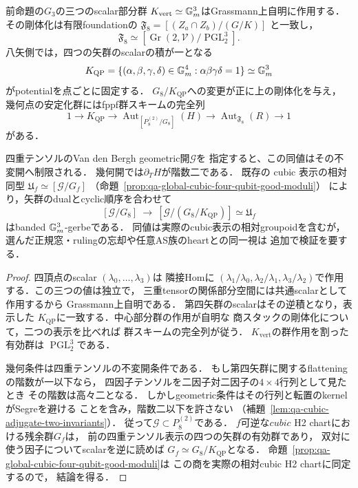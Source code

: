 \begin{corollary}
\label{cor:qa-cubic-qp-pointed-h2-gerbe}
前命題の$G_3$の三つのscalar部分群
\(K_{\mathrm{vert}}\simeq\mathbb G_m^3\)はGrassmann上自明に作用する．
その剛体化は有限foundationの
\(\mathfrak F_8=[(Z_a\cap Z_b)/(G/K)]\) と一致し，
\[
 \mathfrak F_8\simeq
 [\operatorname{Gr}(2,\mathcal V)/\operatorname{PGL}_2^3].
 \tag{Fr}\label{eq:qa-cubic-qp-rigid-foundation}
\]
八矢側では，四つの矢群のscalarの積が一となる
\[
 K_{\mathrm{QP}}=
 \{(\alpha,\beta,\gamma,\delta)\in\mathbb G_m^4:
                 \alpha\beta\gamma\delta=1\}
 \simeq\mathbb G_m^3
\]
がpotentialを点ごとに固定する．
$G_8/K_{\mathrm{QP}}$への変更が正に上の剛体化を与え，
幾何点の安定化群にはfppf群スキームの完全列
\[
 1\longrightarrow K_{\mathrm{QP}}\longrightarrow
 \operatorname{Aut}_{[P_8^{(2)}/G_8]}(H)
 \longrightarrow\operatorname{Aut}_{\mathfrak F_8}(R)
 \longrightarrow1
 \tag{St}\label{eq:qa-cubic-qp-stabilizer-exact}
\]
がある．

四重テンソルのVan den Bergh geometric開$\mathscr G$を
指定すると、この同値はその不変開へ制限される．
幾何開では$\partial_T H$が階数二である．
既存の cubic 表示の相対同型
\(\mathfrak U_f\simeq[\mathscr G/G_f]\)
（命題~\ref{prop:qa-global-cubic-four-qubit-good-moduli}）
により，矢群のdualとcyclic順序を合わせて
\[
 \boxed{\quad
 [\mathscr G/G_8]\ \longrightarrow\
 [\mathscr G/(G_8/K_{\mathrm{QP}})]\simeq\mathfrak U_f
 \quad}
 \tag{HC}\label{eq:qa-cubic-qp-h2-cubic-gerbe}
\]
はbanded $\mathbb G_m^3$-gerbeである．
同値は実際のcubic表示の相対groupoidを含むが，
選んだ正規窓・rulingの忘却や任意AS族のheartとの同一視は
追加で検証を要する．
\end{corollary}
\begin{proof}
四頂点のscalar $(\lambda_0,\ldots,\lambda_3)$は
隣接Homに
$(\lambda_1/\lambda_0,\lambda_2/\lambda_1,
\lambda_3/\lambda_2)$で作用する．この三つの値は独立で，
三重tensorの関係部分空間には共通scalarとして作用するから
Grassmann上自明である．
第四矢群のscalarはその逆積となり，表示した
$K_{\mathrm{QP}}$に一致する．中心部分群の作用が自明な
商スタックの剛体化について，二つの表示を比べれば
群スキームの完全列が従う．
$K_{\mathrm{vert}}$の群作用を割った有効群は
$\operatorname{PGL}_2^3$である．

幾何条件は四重テンソルの不変開条件である．
もし第四矢群に関するflatteningの階数が一以下なら，
四因子テンソルを二因子対二因子の$4\times4$行列として見たとき
その階数は高々二となる．
しかしgeometric条件はその行列と転置のkernelがSegreを避ける
ことを含み，階数二以下を許さない
（補題~\ref{lem:qa-cubic-adjugate-two-invariants}）．
従って$\mathscr G\subset P_8^{(2)}$である．
$f$可逆な$cubic$ H2 chartにおける残余群$G_f$は，
前の四重テンソル表示の四つの矢群の有効群であり，
双対に使う因子についてscalarを逆に読めば
$G_f\simeq G_8/K_{\mathrm{QP}}$となる．
命題~\ref{prop:qa-global-cubic-four-qubit-good-moduli}は
この商を実際の相対cubic H2 chartに同定するので，
結論を得る．
\end{proof}

